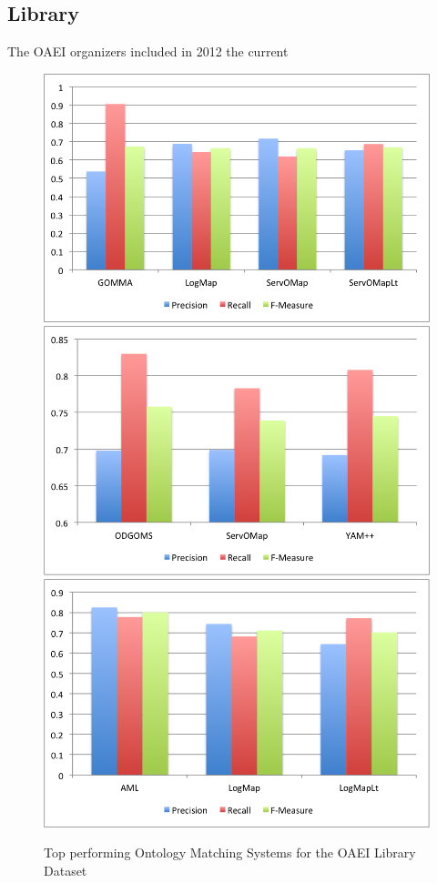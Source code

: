 \documentclass[11pt,titlepage,oneside,openany,a4paper]{report}
\begin{document}
\subsection{Library}
The OAEI organizers included in 2012 the current 
\begin{figure}
 \includegraphics[scale=.5]{figures/oaei/library/top2012.png}
 \includegraphics[scale=.5]{figures/oaei/library/top2013.png}  
 \includegraphics[scale=.5]{figures/oaei/library/top2014.png} 
 \caption{Top performing Ontology Matching Systems for  the OAEI Library Dataset}
 \label{img::library}
\end{figure}
\end{document}

